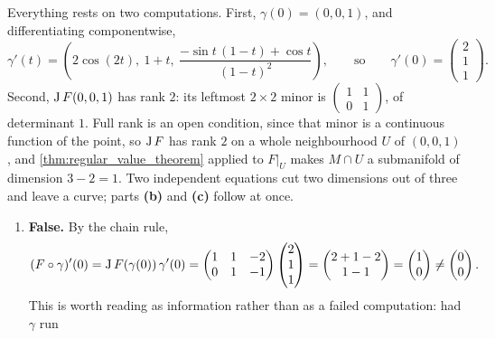 \begin{exercisesolution}
\label{sol:level_set_of_a_wide_jacobian}
Everything rests on two computations. First, $\gamma(0) = (0,0,1)$, and differentiating
componentwise,
\[\gamma'(t) = \left(2\cos(2t),\ 1+t,\
  \frac{-\sin t\,(1-t) + \cos t}{(1-t)^2}\right), \qquad\text{so}\qquad
  \gamma'(0) = \begin{pmatrix} 2 \\ 1 \\ 1 \end{pmatrix}.\]
Second, $\operatorname{J} F(0,0,1)$ has rank $2$: its leftmost $2\times2$ minor is
$\left(\begin{smallmatrix} 1 & 1 \\ 0 & 1\end{smallmatrix}\right)$, of determinant $1$. Full rank
is an open condition, since that minor is a continuous function of the point, so $\operatorname{J} F$ has
rank $2$ on a whole neighbourhood $U$ of $(0,0,1)$, and \cref{thm:regular_value_theorem} applied
to $F|_U$ makes $M \cap U$ a submanifold of dimension $3-2 = 1$. Two independent equations cut
two dimensions out of three and leave a curve; parts \textbf{(b)} and \textbf{(c)} follow at
once.
\begin{enumerate}[label=\textbf{(\alph*)}]
  \item \textbf{False.} By the chain rule,
    \[(F\circ\gamma)'(0) = \operatorname{J} F(\gamma(0))\,\gamma'(0)
      = \begin{pmatrix} 1 & 1 & -2 \\ 0 & 1 & -1\end{pmatrix}
        \begin{pmatrix} 2 \\ 1 \\ 1 \end{pmatrix}
      = \begin{pmatrix} 2+1-2 \\ 1-1 \end{pmatrix}
      = \begin{pmatrix} 1 \\ 0 \end{pmatrix} \neq \begin{pmatrix} 0 \\ 0\end{pmatrix}.\]
    This is worth reading as information rather than as a failed computation: had $\gamma$ run

\end{enumerate}
\end{exercisesolution}
